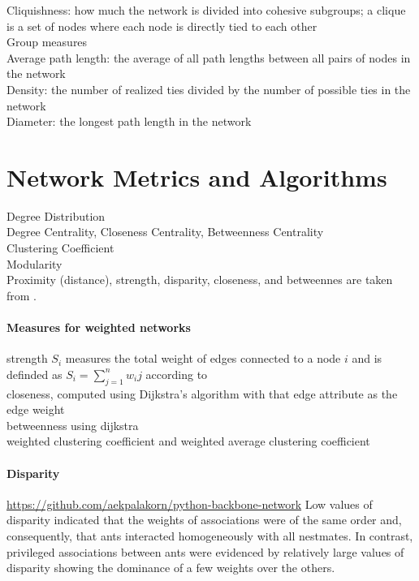 Cliquishness: how much the network is divided into cohesive
subgroups; a clique is a set of nodes where each node
is directly tied to each other\\

Group measures\\

Average path length: the average of all path lengths between
all pairs of nodes in the network\\

Density: the number of realized ties divided by the number
of possible ties in the network\\

Diameter: the longest path length in the network\\
\textcite{wey2008social}

\section{Network Metrics and Algorithms}
Degree Distribution\\
Degree Centrality, Closeness Centrality, Betweenness Centrality\\
Clustering Coefficient\\
Modularity\\

Proximity (distance), strength, disparity, closeness, and betweennes are taken from \textcite{jeanson2012long}.\\

\paragraph*{Measures for weighted networks}
strength $S_i$ measures the total weight of edges connected to a node $i$ and is definded as $S_i = \sum_{j=1}^{n}w_ij$ according to~\textcite{barrat2004architecture}\\
closeness, computed using Dijkstra’s algorithm with that edge attribute as the edge weight~\cite{newman2001scientific}\\
betweenness using dijkstra~\cite{brandes2001faster}\\

weighted clustering coefficient and weighted average clustering coefficient~\cite{saramaki2007generalizations}\\

\paragraph*{Disparity}
\url{https://github.com/aekpalakorn/python-backbone-network}
Low values of disparity indicated that the weights of associations were of the same order and, consequently, that ants interacted homogeneously with all nestmates. In contrast, privileged associations between ants were evidenced by relatively large values of disparity showing the dominance of a few weights over the others.~\cite{barthelemy2005characterization}

